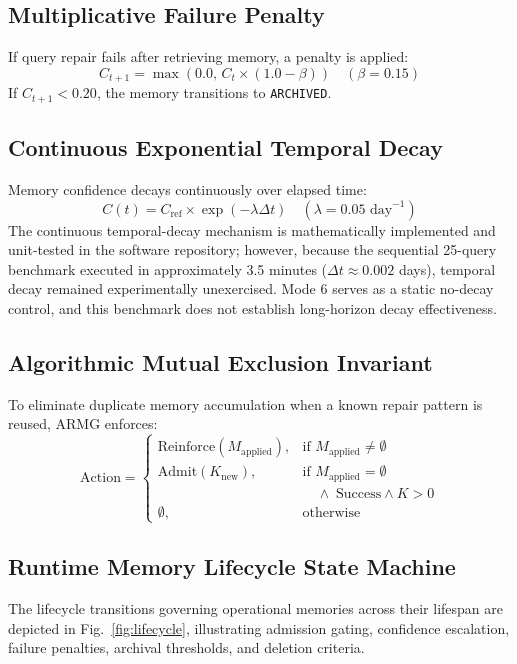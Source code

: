 \subsection{Multiplicative Failure Penalty}
If query repair fails after retrieving memory, a penalty is applied:
\begin{equation}
C_{t+1} = \max(0.0, \, C_t \times (1.0 - \beta)) \quad (\beta = 0.15)
\end{equation}
If $C_{t+1} < 0.20$, the memory transitions to \texttt{ARCHIVED}.

\subsection{Continuous Exponential Temporal Decay}
Memory confidence decays continuously over elapsed time:
\begin{equation}
C(t) = C_{\text{ref}} \times \exp(-\lambda \Delta t) \quad (\lambda = 0.05 \text{ day}^{-1})
\end{equation}
The continuous temporal-decay mechanism is mathematically implemented and unit-tested in the software repository; however, because the sequential 25-query benchmark executed in approximately 3.5 minutes ($\Delta t \approx 0.002$ days), temporal decay remained experimentally unexercised. Mode 6 serves as a static no-decay control, and this benchmark does not establish long-horizon decay effectiveness.

\subsection{Algorithmic Mutual Exclusion Invariant}
To eliminate duplicate memory accumulation when a known repair pattern is reused, ARMG enforces:
\begin{equation}
\text{Action} = \begin{cases} 
\text{Reinforce}(M_{\text{applied}}), & \text{if } M_{\text{applied}} \neq \emptyset \\ 
\text{Admit}(K_{\text{new}}), & \text{if } M_{\text{applied}} = \emptyset \\
& \quad \land \; \text{Success} \land K > 0 \\ 
\emptyset, & \text{otherwise} 
\end{cases}
\end{equation}

\subsection{Runtime Memory Lifecycle State Machine}
The lifecycle transitions governing operational memories across their lifespan are depicted in Fig.~\ref{fig:lifecycle}, illustrating admission gating, confidence escalation, failure penalties, archival thresholds, and deletion criteria.

